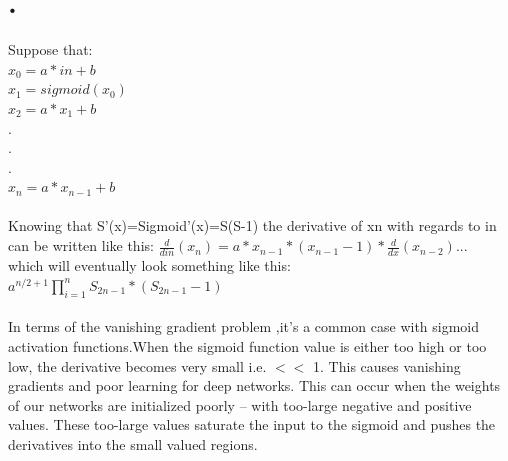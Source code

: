 \documentclass{article}
\begin{document}
\section{.}
Suppose that:\\
$x_0=a*in+b$\\
$x_1=sigmoid(x_0)$\\
$x_2=a*x_1+b$\\
.\\
.\\
.\\
$x_n=a*x_{n-1}+b$\\~\\
Knowing that S'(x)=Sigmoid'(x)=S(S-1) the derivative of xn with regards to in can be written like this:
$\frac{d}{din}(x_n)=a*x_{n-1}*(x_{n-1}-1)*\frac{d}{dx}(x_{n-2})...$\\
which will eventually look something like this:\\
$a^{n/2+1}\prod_{i=1}^{n} S_{2n-1}*(S_{2n-1}-1)$\\~\\
In terms of the vanishing gradient problem ,it's a common case with sigmoid activation functions.When the sigmoid function value is either too high or too low, the derivative becomes very small i.e. $<<$ 1. This causes vanishing gradients and poor learning for deep networks. This can occur when the weights of our networks are initialized poorly – with too-large negative and positive values. These too-large values saturate the input to the sigmoid and pushes the derivatives into the small valued regions. 

\newpage
\end{document}
